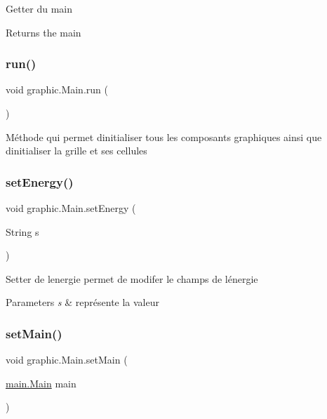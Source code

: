 Getter du main \begin{DoxyReturn}{Returns}
the main 
\end{DoxyReturn}
\hypertarget{classgraphic_1_1_main_a0d2917dabb35ec2691d660a20a663139}{}\label{classgraphic_1_1_main_a0d2917dabb35ec2691d660a20a663139} 
\subsubsection{\texorpdfstring{run()}{run()}}
{\footnotesize\ttfamily void graphic.\+Main.\+run (\begin{DoxyParamCaption}{ }\end{DoxyParamCaption})}

Méthode qui permet d\textquotesingle{}initialiser tous les composants graphiques ainsi que d\textquotesingle{}initialiser la grille et ses cellules \hypertarget{classgraphic_1_1_main_a4c7ddcd2bfc33ac56722e7f6970afbc2}{}\label{classgraphic_1_1_main_a4c7ddcd2bfc33ac56722e7f6970afbc2} 
\subsubsection{\texorpdfstring{set\+Energy()}{setEnergy()}}
{\footnotesize\ttfamily void graphic.\+Main.\+set\+Energy (\begin{DoxyParamCaption}\item[{String}]{s }\end{DoxyParamCaption})}

Setter de l\textquotesingle{}energie permet de modifer le champs de l\textquotesingle{}énergie 
\begin{DoxyParams}{Parameters}
{\em s} & représente la valeur \\
\hline
\end{DoxyParams}
\hypertarget{classgraphic_1_1_main_ad5a607609bf30c7d09d3340c118b4c57}{}\label{classgraphic_1_1_main_ad5a607609bf30c7d09d3340c118b4c57} 
\subsubsection{\texorpdfstring{set\+Main()}{setMain()}}
{\footnotesize\ttfamily void graphic.\+Main.\+set\+Main (\begin{DoxyParamCaption}\item[{\hyperlink{classmain_1_1_main}{main.\+Main}}]{main }\end{DoxyParamCaption})}

